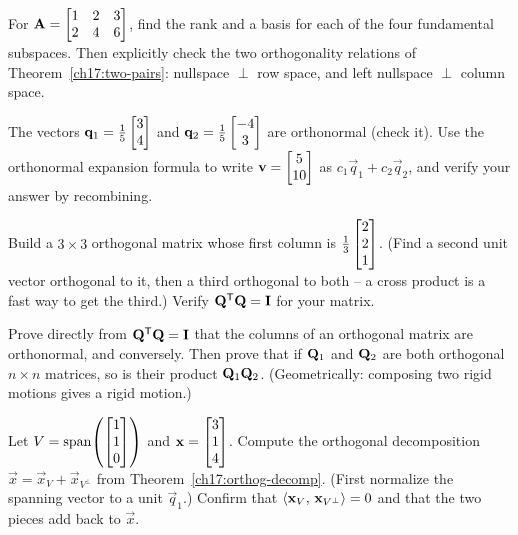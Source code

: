 \begin{exercise}\label{ch17:ex-four-spaces}
For $\mathbf{A}=\begin{bmatrix}1&2&3\\2&4&6\end{bmatrix}$, find the rank and a basis for each of the four
fundamental subspaces. Then explicitly check the two orthogonality relations of
Theorem~\ref{ch17:two-pairs}: nullspace $\perp$ row space, and left nullspace $\perp$ column space.
\end{exercise}

\begin{exercise}\label{ch17:ex-orthonormal-coords}
The vectors $\mathbf{q}_1=\tfrac15\begin{bmatrix}3\\4\end{bmatrix}$ and $\mathbf{q}_2=\tfrac15\begin{bmatrix}-4\\3\end{bmatrix}$ are orthonormal
(check it). Use the orthonormal expansion formula to write $\mathbf{v}=\begin{bmatrix}5\\10\end{bmatrix}$ as
$c_1\vec q_1+c_2\vec q_2$, and verify your answer by recombining.
\end{exercise}

\begin{exercise}\label{ch17:ex-build-Q}
Build a $3\times3$ orthogonal matrix whose first column is $\tfrac13\begin{bmatrix}2\\2\\1\end{bmatrix}$.
(Find a second unit vector orthogonal to it, then a third orthogonal to both -- a cross product is a
fast way to get the third.) Verify $\mathbf{Q}^{\mathsf{T}}\mathbf{Q}=\mathbf{I}$ for your matrix.
\end{exercise}

\begin{exercise}\label{ch17:ex-preserve-proof}
Prove directly from $\mathbf{Q}^{\mathsf{T}}\mathbf{Q}=\mathbf{I}$ that the columns of an orthogonal matrix are
orthonormal, and conversely. Then prove that if $\mathbf{Q}_1$ and $\mathbf{Q}_2$ are both orthogonal
$n\times n$ matrices, so is their product $\mathbf{Q}_1\mathbf{Q}_2$. (Geometrically: composing two rigid
motions gives a rigid motion.)
\end{exercise}

\begin{exercise}\label{ch17:ex-split}
Let $V=\operatorname{span}\!\left(\begin{bmatrix}1\\1\\0\end{bmatrix}\right)$ and $\mathbf{x}=\begin{bmatrix}3\\1\\4\end{bmatrix}$. Compute the orthogonal
decomposition $\vec x=\vec x_V+\vec x_{V^\perp}$ from Theorem~\ref{ch17:orthog-decomp}.
(First normalize the spanning vector to a unit $\vec q_1$.) Confirm that
$\langle \mathbf{x}_V,\, \mathbf{x}_{V^\perp} \rangle=0$ and that the two pieces add back to $\vec x$.
\end{exercise}


